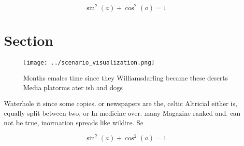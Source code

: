 \documentclass[a4paper]{article}
\begin{document}
\[ \sin^2(a)+\cos^2(a) = 1 \]

\section{Section}

\begin{figure}
\centering
\texttt{[image: ../scenario\_visualization.png]}
\caption{Months emales time since they Williamsdarling became these deserts Media platorms ater ish and dogs
}
\end{figure}
 
Waterhole it since some copies. or newspapers are the, celtic Altricial either is, equally split between two, or In medicine over. many Magazine ranked and. can not be true, inormation spreads like wildire. Se

\[ \sin^2(a)+\cos^2(a) = 1 \]
\end{document}
